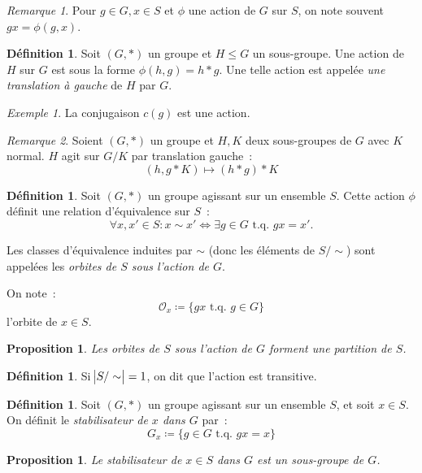 \documentclass{article}
\newtheorem{prp}[thm]{Proposition}
\theoremstyle{definition}
\newtheorem{déf}[thm]{Définition}
\theoremstyle{remark}
\newtheorem*{rmq}{Remarque}
\newtheorem{ex}{Exemple}[section]
\newcommand{\tq}{\text{ t.q. }}
\begin{document}
	\begin{rmq} Pour $g \in G, x \in S$ et $\phi$ une action de $G$ sur $S$, on note souvent $gx = \phi(g, x)$.
	\end{rmq}

	\begin{déf} Soit $(G, *)$ un groupe et $H \leq G$ un sous-groupe. Une action de $H$ sur $G$ est sous la forme $\phi(h, g) = h*g$. Une telle action est appelée
	\textit{une translation à gauche} de $H$ par $G$.
	\end{déf}

	\begin{ex} La conjugaison $c(g)$ est une action.
	\end{ex}

	\begin{rmq} Soient $(G, *)$ un groupe et $H, K$ deux sous-groupes de $G$ avec $K$ normal. $H$ agit sur $G/K$ par translation gauche~:
	\[(h, g*K) \mapsto (h*g)*K\]
	\end{rmq}

	\begin{déf} Soit $(G, *)$ un groupe agissant sur un ensemble $S$. Cette action $\phi$ définit une relation d'équivalence sur $S$~:
	\[\forall x, x' \in S : x \sim x' \iff \exists g \in G \tq gx = x'.\]

	Les classes d'équivalence induites par $\sim$ (donc les éléments de $S/\sim$) sont appelées les \textit{orbites de $S$ sous l'action de $G$}.

	On note~:
	\[\mathcal O_x \coloneqq \{gx \tq g \in G\}\]
	l'orbite de $x \in S$.
	\end{déf}

	\begin{prp} Les orbites de $S$ sous l'action de $G$ forment une partition de $S$.
	\end{prp}

	\begin{déf} Si $\abs {S/\sim} = 1$, on dit que l'action est transitive.
	\end{déf}

	\begin{déf} Soit $(G, *)$ un groupe agissant sur un ensemble $S$, et soit $x \in S$. On définit le \textit{stabilisateur de $x$ dans $G$} par~:
	\[G_x \coloneqq \{g \in G \tq gx = x\}\]
	\end{déf}

	\begin{prp} Le stabilisateur de $x \in S$ dans $G$ est un sous-groupe de $G$.
	\end{prp}
\end{document}
